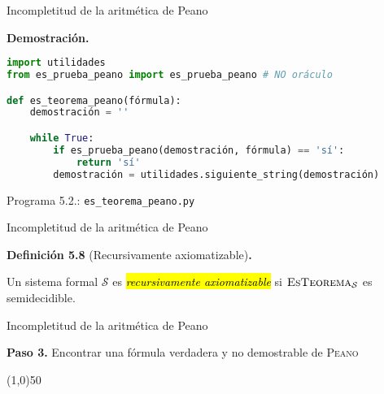 \documentclass[10pt,xcolor=dvipsnames,aspectratio=169,spanish]{beamer}
\makeatletter
\let\HL\hl
\renewcommand\hl{%
  \let\set@color\beamerorig@set@color
  \let\reset@color\beamerorig@reset@color
  \HL}
\newcommand{\hle}[1]{\hl{\emph{#1}}}
\makeatother
\begin{document}
\begin{frame}[fragile]{Incompletitud de la aritmética de Peano}

\textbf{Demostración.}

\begin{lstlisting}[language=Python]
import utilidades
from es_prueba_peano import es_prueba_peano # NO oráculo

def es_teorema_peano(fórmula):
    demostración = ''

    while True:
        if es_prueba_peano(demostración, fórmula) == 'sí':
            return 'sí'
        demostración = utilidades.siguiente_string(demostración)
\end{lstlisting}
\vspace*{-4mm}
\begin{center}
{\small Programa 5.2.: \texttt{es\_teorema\_peano.py}}
\end{center}

\vspace*{-9.5mm}

\hfill\square

\end{frame}


\begin{frame}{Incompletitud de la aritmética de Peano}

\textbf{Definición 5.8} (Recursivamente axiomatizable)\textbf{.}

Un sistema formal $\mathcal{S}$ es \hle{recursivamente axiomatizable} si $\textsc{EsTeorema}_\mathcal{S}$ es semidecidible.
\end{frame}

\begin{frame}[fragile]{Incompletitud de la aritmética de Peano}

\begin{center}
    \textbf{Paso 3.} Encontrar una fórmula verdadera y no demostrable de \textsc{Peano}

    \line(1,0){50}
\end{center}

\end{frame}
\end{document}
